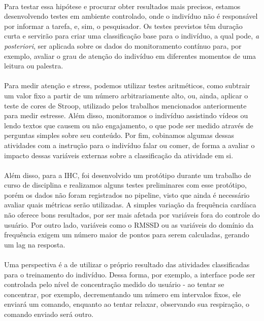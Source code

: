         \paragraph{} Para testar essa hipótese e procurar obter resultados mais precisos, estamos desenvolvendo testes em ambiente controlado, onde o indivíduo não é responsável por informar a tarefa, e, sim, o pesquisador. Os testes previstos têm duração curta e servirão para criar uma classificação base para o indivíduo, a qual pode, \textit{a posteriori}, ser aplicada sobre os dados do monitoramento contínuo para, por exemplo, avaliar o grau de atenção do indivíduo em diferentes momentos de uma leitura ou palestra. 
        
        \paragraph{} Para medir atenção e stress, podemos utilizar testes aritméticos, como subtrair um valor fixo a partir de um número arbitrariamente alto, ou, ainda, aplicar o teste de cores de Stroop, utilizado pelos trabalhos mencionados anteriormente para medir estresse. Além disso, monitoramos o indivíduo assistindo vídeos ou lendo textos que causem ou não engajamento, o que pode ser medido através de perguntas simples sobre seu conteúdo. Por fim, cobinamos algumas dessas atividades com a instrução para o indivíduo falar ou comer, de forma a avaliar o impacto dessas variáveis externas sobre a classificação da atividade em si.
        
        \paragraph{} Além disso, para a IHC, foi desenvolvido um protótipo durante um trabalho de curso de disciplina e realizamos alguns testes preliminares com esse protótipo, porém os dados não foram registrados no pipeline, visto que ainda é necessário avaliar quais métricas serão utilizadas. A simples variação da frequência cardíaca não oferece bons resultados, por ser mais afetada por variáveis fora do controle do usuário. Por outro lado, variáveis como o RMSSD ou as variáveis do domínio da frequência exigem um número maior de pontos para serem calculadas, gerando um lag na resposta. 
        
        \paragraph{} Uma perspectiva é a de utilizar o próprio resultado das atividades classificadas para o treinamento do indivíduo. Dessa forma, por exemplo, a interface pode ser controlada pelo nível de concentração medido do usuário - ao tentar se concentrar, por exemplo, decrementando um número em intervalos fixos, ele enviará um comando, enquanto ao tentar relaxar, observando sua respiração, o comando enviado será outro.
